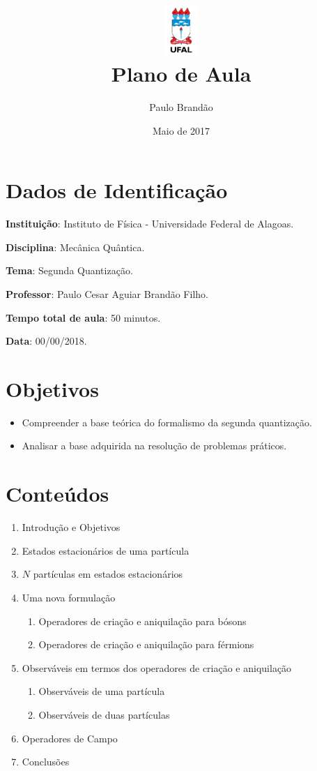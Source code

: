 \documentclass{article}
\title{\includegraphics[width=0.1\textwidth]{ufallogo.png} \\
\Huge{\color{astral}\textbf{Plano de Aula}}}
\author{Paulo Brandão}
\date{Maio de 2017}
\begin{document}
\maketitle

\section{Dados de Identificação}

\noindent \textbf{Instituição}: Instituto de Física - Universidade Federal de Alagoas.

\noindent \textbf{Disciplina}: Mecânica Quântica.

\noindent \textbf{Tema}: Segunda Quantização.

\noindent \textbf{Professor}: Paulo Cesar Aguiar Brandão Filho.

\noindent \textbf{Tempo total de aula}: 50 minutos.

\noindent \textbf{Data}: 00/00/2018.

\section{Objetivos}

\begin{itemize}
    \item Compreender a base teórica do formalismo da segunda quantização.
    \item Analisar a base adquirida na resolução de problemas práticos.
\end{itemize}

\section{Conteúdos}

\begin{enumerate}
    \item Introdução e Objetivos
    \item Estados estacionários de uma partícula
    \item $N$ partículas em estados estacionários
    \item Uma nova formulação
        \begin{enumerate}
            \item Operadores de criação e aniquilação para bósons
            \item Operadores de criação e aniquilação para férmions
        \end{enumerate}
    \item Observáveis em termos dos operadores de criação e aniquilação
    \begin{enumerate}
        \item Observáveis de uma partícula
        \item Observáveis de duas partículas
    \end{enumerate}
    \item Operadores de Campo
    \item Conclusões
\end{enumerate}
\end{document}
